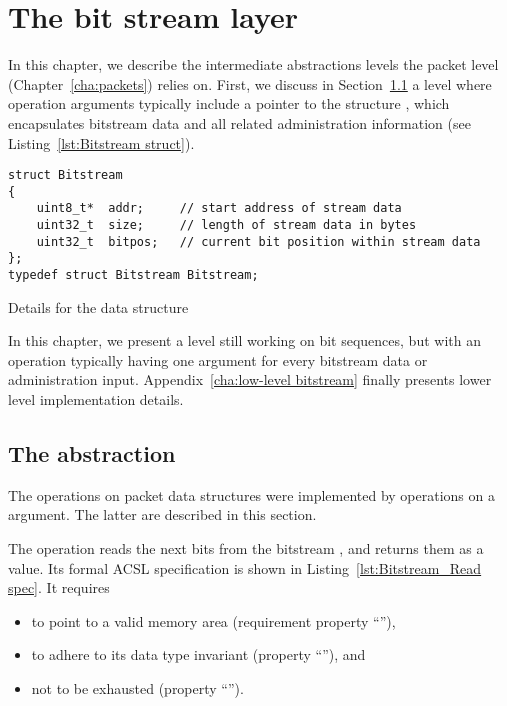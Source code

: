 


\chapter{The bit stream layer}
\label{cha:bitstream}

In this chapter, we describe the intermediate abstractions levels the
packet level (Chapter~\ref{cha:packets}) relies on.
%
First, we discuss in Section~\ref{sec:bitstream}
a level where operation arguments typically include a pointer to the
\isoc structure , which
encapsulates bitstream data and all related administration information 
(see Listing~\ref{lst:Bitstream struct}).


\begin{listing}[hbt]
\begin{minipage}{0.99\textwidth}
\begin{lstlisting}[style=acsl-block]
struct Bitstream
{
    uint8_t*  addr;     // start address of stream data
    uint32_t  size;     // length of stream data in bytes
    uint32_t  bitpos;   // current bit position within stream data
};
typedef struct Bitstream Bitstream;
\end{lstlisting}
\end{minipage}
\caption{\label{lst:Bitstream struct}
	Details for the  data structure}
\end{listing}

\FloatBarrier

In this chapter, we present a level still working on
bit sequences, but with an operation typically
having one argument for every bitstream data or administration input.
%
Appendix~\ref{cha:low-level bitstream} finally presents lower level implementation details.


\clearpage

\section{The  abstraction}
\label{sec:bitstream}

The operations on packet data structures were implemented by 
operations on a  argument.
%
The latter are described in this section.

The operation 
reads the next  bits from the bitstream
, and returns them as a  value.
%
Its formal ACSL specification is shown in 
Listing~\ref{lst:Bitstream_Read spec}.
%
It requires 
%
\begin{itemize}
\item to point to a valid memory area 
	(requirement property ``''),
\item to adhere to its data type invariant
	(property ``''), and
\item not to be exhausted (property ``'').
\end{itemize}

